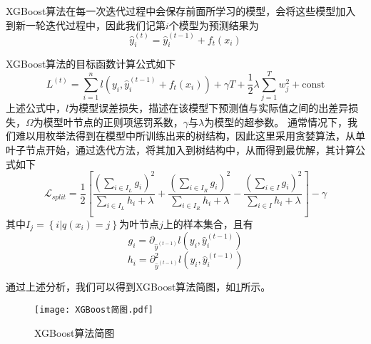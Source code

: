\documentclass{MathorCupModeling}
\begin{document}
		XGBoost算法在每一次迭代过程中会保存前面所学习的模型，会将这些模型加入到新一轮迭代过程中，因此我们记第$i$个模型为预测结果为
		\begin{equation}
			\hat{y}_{i}^{\left(t\right)}=\hat{y}_{i}^{\left(t-1\right)}+f_t\left(x_i\right) \label{fXGBoostyprei}
		\end{equation}
		
		XGBoost算法的目标函数计算公式如下
		\begin{equation}
			L^{\left(t\right)}=\sum\limits_{i=1}^{n}l\left(y_i,\hat{y}_{i}^{\left(t-1\right)}+f_t\left(x_i\right)\right)+\gamma T+\frac{1}{2}\lambda\sum\limits_{j=1}^T{w_j^2}+\mathrm{const} \label{fXGBoostL}
		\end{equation}
		上述公式中，$l$为模型误差损失，描述在该模型下预测值与实际值之间的出差异损失，$\Omega$为模型叶节点的正则项惩罚系数，$\gamma$与$\lambda$为模型的超参数\textcolor{blue}{\cite{pxgboost2}}。
		通常情况下，我们难以用枚举法得到在模型中所训练出来的树结构，因此这里采用贪婪算法，从单叶子节点开始，通过迭代方法，将其加入到树结构中，从而得到最优解，其计算公式\textcolor{blue}{\cite{pxgboost3}}如下
		\begin{equation}
			\mathcal{L}_{split}=\frac{1}{2}\left[\frac{\left(\sum_{i\in I_L}g_i\right)^2}{\sum_{i\in I_L}h_i+\lambda}+\frac{\left(\sum_{i\in I_R}g_i\right)^2}{\sum_{i\in I_R}h_i+\lambda}-\frac{\left(\sum_{i\in I}g_i\right)^2}{\sum_{i\in I}h_i+\lambda}\right]-\gamma \label{fXGBoostLsplit}
		\end{equation}
		其中$I_j=\left\{i|q\left(x_i\right)=j\right\}$为叶节点$j$上的样本集合\textcolor{blue}{\cite{pxgboost2}}，且有
		\begin{equation}
			g_i=\partial_{\hat{y}^{\left(t-1\right)}}l\left(y_i,\hat{y}_i^{\left(t-1\right)}\right) \label{xgboostgi}
		\end{equation}
		\begin{equation}
			h_i=\partial_{\hat{y}^{\left(t-1\right)}}^2l\left(y_i,\hat{y}_i^{\left(t-1\right)}\right) \label{xgboosthi}
		\end{equation}
	
		通过上述分析，我们可以得到XGBoost算法简图，如\textcolor{blue}{\cref{fig:XGBoost}}所示。
		\begin{figure}[H]
			\centerline{\texttt{[image: XGBoost简图.pdf]}}
			\caption{XGBoost算法简图}\label{fig:XGBoost}
		\end{figure}
\end{document}
